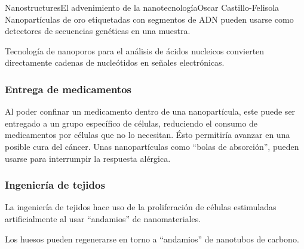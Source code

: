 \begin{article}{Nanostructures}{El advenimiento de la nanotecnolog\'ia}{Oscar Castillo-Felisola}
Nanopart\'iculas de oro etiquetadas con segmentos de ADN pueden usarse como detectores de secuencias gen\'eticas en una muestra.

Tecnolog\'ia de nanoporos para el an\'alisis de \'acidos nucleicos convierten directamente cadenas de nucle\'otidos en se\~nales electr\'onicas.






\subsubsection*{Entrega de medicamentos}


Al poder confinar un medicamento dentro de una nanopart\'icula, este puede ser entregado a un grupo espec\'ifico de c\'elulas, reduciendo el consumo de medicamentos por c\'elulas que no lo necesitan. \'Esto permitir\'ia avanzar en una posible %
cura del c\'ancer.
Unas nanopart\'iculas como ``bolas de absorci\'on'', pueden usarse para interrumpir la respuesta al\'ergica. 

\subsubsection*{Ingenier\'ia de tejidos}

La ingenier\'ia de tejidos hace uso de la proliferaci\'on de c\'elulas estimuladas artificialmente al usar ``andamios'' de nanomateriales.

Los huesos pueden regenerarse en torno a ``andamios'' de nanotubos de carbono.




\end{article}
